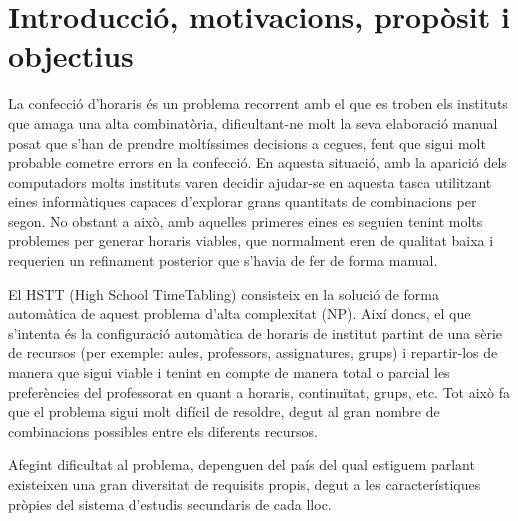 \documentclass[11pt,a4paper,twoside]{report}
\begin{document}
  \tableofcontents
  
  \chapter{Introducció, motivacions, propòsit i objectius}
  

  La confecció d'horaris és un problema recorrent amb el que es troben els instituts que amaga una alta combinatòria, dificultant-ne molt la seva elaboració manual posat que s'han de prendre moltíssimes decisions a cegues,
  fent que sigui molt probable cometre errors en la confecció. En aquesta situació, amb la aparició dels computadors molts instituts varen decidir ajudar-se en aquesta tasca utilitzant eines informàtiques capaces 
  d'explorar grans quantitats de combinacions per segon. No obstant a això, amb aquelles primeres eines es seguien tenint molts problemes per generar horaris viables, que normalment eren de qualitat baixa 
  i requerien un refinament posterior que s'havia de fer de forma manual.
  
  El HSTT (High School TimeTabling) consisteix en la solució de forma automàtica de aquest problema d'alta complexitat (NP). 
  Així doncs, el que s'intenta és la configuració automàtica de horaris de institut partint de una sèrie de recursos 
  (per exemple: aules, professors, assignatures, grups) i repartir-los de manera que sigui viable i tenint en compte 
  de manera total o parcial les preferències del professorat en quant a horaris, continuïtat, grups, etc. Tot això fa que el problema sigui molt difícil de resoldre, degut al gran nombre de combinacions possibles entre els diferents recursos.
  
  Afegint dificultat al problema, depenguen del país del qual estiguem parlant existeixen una gran diversitat de requisits propis, degut a les característiques pròpies del sistema d'estudis secundaris de cada lloc.
\end{document}
